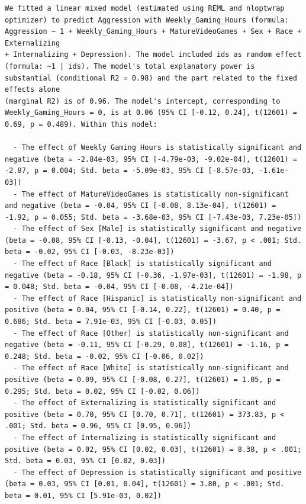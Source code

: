 \documentclass{article}
\begin{document}
\begin{verbatim}
We fitted a linear mixed model (estimated using REML and nloptwrap optimizer) to predict Aggression with Weekly_Gaming_Hours (formula: Aggression ~ 1 + Weekly_Gaming_Hours + MatureVideoGames + Sex + Race + Externalizing
+ Internalizing + Depression). The model included ids as random effect (formula: ~1 | ids). The model's total explanatory power is substantial (conditional R2 = 0.98) and the part related to the fixed effects alone
(marginal R2) is of 0.96. The model's intercept, corresponding to Weekly_Gaming_Hours = 0, is at 0.06 (95% CI [-0.12, 0.24], t(12601) = 0.69, p = 0.489). Within this model:

  - The effect of Weekly Gaming Hours is statistically significant and negative (beta = -2.84e-03, 95% CI [-4.79e-03, -9.02e-04], t(12601) = -2.87, p = 0.004; Std. beta = -5.09e-03, 95% CI [-8.57e-03, -1.61e-03])
  - The effect of MatureVideoGames is statistically non-significant and negative (beta = -0.04, 95% CI [-0.08, 8.13e-04], t(12601) = -1.92, p = 0.055; Std. beta = -3.68e-03, 95% CI [-7.43e-03, 7.23e-05])
  - The effect of Sex [Male] is statistically significant and negative (beta = -0.08, 95% CI [-0.13, -0.04], t(12601) = -3.67, p < .001; Std. beta = -0.02, 95% CI [-0.03, -8.23e-03])
  - The effect of Race [Black] is statistically significant and negative (beta = -0.18, 95% CI [-0.36, -1.97e-03], t(12601) = -1.98, p = 0.048; Std. beta = -0.04, 95% CI [-0.08, -4.21e-04])
  - The effect of Race [Hispanic] is statistically non-significant and positive (beta = 0.04, 95% CI [-0.14, 0.22], t(12601) = 0.40, p = 0.686; Std. beta = 7.91e-03, 95% CI [-0.03, 0.05])
  - The effect of Race [Other] is statistically non-significant and negative (beta = -0.11, 95% CI [-0.29, 0.08], t(12601) = -1.16, p = 0.248; Std. beta = -0.02, 95% CI [-0.06, 0.02])
  - The effect of Race [White] is statistically non-significant and positive (beta = 0.09, 95% CI [-0.08, 0.27], t(12601) = 1.05, p = 0.295; Std. beta = 0.02, 95% CI [-0.02, 0.06])
  - The effect of Externalizing is statistically significant and positive (beta = 0.70, 95% CI [0.70, 0.71], t(12601) = 373.83, p < .001; Std. beta = 0.96, 95% CI [0.95, 0.96])
  - The effect of Internalizing is statistically significant and positive (beta = 0.02, 95% CI [0.02, 0.03], t(12601) = 8.38, p < .001; Std. beta = 0.03, 95% CI [0.02, 0.03])
  - The effect of Depression is statistically significant and positive (beta = 0.03, 95% CI [0.01, 0.04], t(12601) = 3.80, p < .001; Std. beta = 0.01, 95% CI [5.91e-03, 0.02])


\end{verbatim}
\end{document}
